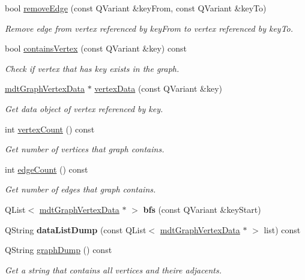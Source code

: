 \begin{DoxyCompactItemize}
\item 
bool \hyperlink{classmdt_graph_a7d74a6367016cf6f3a340eb0a661c60b}{removeEdge} (const QVariant \&keyFrom, const QVariant \&keyTo)
\begin{DoxyCompactList}\small\item\em Remove edge from vertex referenced by keyFrom to vertex referenced by keyTo. \end{DoxyCompactList}\item 
bool \hyperlink{classmdt_graph_a0a280c806f1e83152c96524c78b0ea79}{containsVertex} (const QVariant \&key) const 
\begin{DoxyCompactList}\small\item\em Check if vertex that has key exists in the graph. \end{DoxyCompactList}\item 
\hyperlink{classmdt_graph_vertex_data}{mdtGraphVertexData} $\ast$ \hyperlink{classmdt_graph_a237dc328d01edc5fae81dd8b63af656d}{vertexData} (const QVariant \&key)
\begin{DoxyCompactList}\small\item\em Get data object of vertex referenced by key. \end{DoxyCompactList}\item 
int \hyperlink{classmdt_graph_a4329c45223eb1bc8274aa8c1fc1292c0}{vertexCount} () const 
\begin{DoxyCompactList}\small\item\em Get number of vertices that graph contains. \end{DoxyCompactList}\item 
int \hyperlink{classmdt_graph_a7782f9730b637e7bac70c124761a9bc0}{edgeCount} () const 
\begin{DoxyCompactList}\small\item\em Get number of edges that graph contains. \end{DoxyCompactList}\item 
\hypertarget{classmdt_graph_a5808d5538e67902eb1da5292af8a0c87}{
QList$<$ \hyperlink{classmdt_graph_vertex_data}{mdtGraphVertexData} $\ast$ $>$ {\bfseries bfs} (const QVariant \&keyStart)}
\label{classmdt_graph_a5808d5538e67902eb1da5292af8a0c87}

\item 
\hypertarget{classmdt_graph_a1143421d4846e76b800482ad29959570}{
QString {\bfseries dataListDump} (const QList$<$ \hyperlink{classmdt_graph_vertex_data}{mdtGraphVertexData} $\ast$ $>$ list) const }
\label{classmdt_graph_a1143421d4846e76b800482ad29959570}

\item 
QString \hyperlink{classmdt_graph_ac01bc5099ebe581fe961c90de04f87b2}{graphDump} () const 
\begin{DoxyCompactList}\small\item\em Get a string that contains all vertices and theire adjacents. \end{DoxyCompactList}\end{DoxyCompactItemize}


